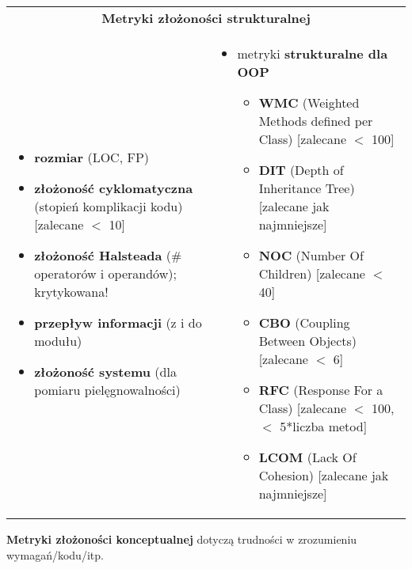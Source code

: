 \documentclass[../main.tex]{subfiles}
\begin{document}
    \begin{table}[H]
        \begin{center}
            \begin{tabular}{p{8cm} p{8cm}}
                \multicolumn{2}{c}{  \textbf{Metryki złożoności strukturalnej}} \\
                \begin{itemize}
                    \item \textbf{rozmiar} (LOC, FP)
                    \item \textbf{złożoność cyklomatyczna} (stopień komplikacji kodu) [zalecane $<$ 10]
                    \item \textbf{złożoność Halsteada} (\# operatorów i operandów); krytykowana!
                    \item \textbf{przepływ informacji} (z i do modułu)
                    \item \textbf{złożoność systemu} (dla pomiaru pielęgnowalności)
                \end{itemize}
                &
                \begin{itemize}
                    \item metryki \textbf{strukturalne dla OOP}
                    \begin{itemize}
                        \item \textbf{WMC} (Weighted Methods defined per Class) [zalecane $<$ 100]
                        \item \textbf{DIT} (Depth of Inheritance Tree) [zalecane jak najmniejsze]
                        \item \textbf{NOC} (Number Of Children) [zalecane $<$ 40]
                        \item \textbf{CBO} (Coupling Between Objects) [zalecane $<$ 6]
                        \item \textbf{RFC} (Response For a Class) [zalecane $<$ 100, $<$ 5*liczba metod]
                        \item \textbf{LCOM} (Lack Of Cohesion) [zalecane jak najmniejsze]
                    \end{itemize}
                \end{itemize} \\
            \end{tabular}
        \end{center}
    \end{table}

    \textbf{Metryki złożoności konceptualnej} dotyczą trudności w zrozumieniu wymagań/kodu/itp.\\
\end{document}
